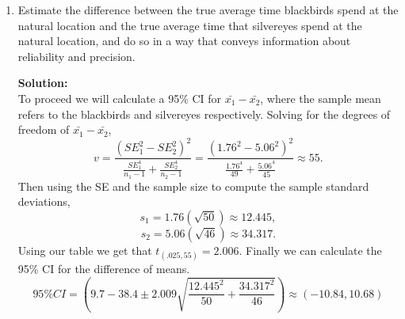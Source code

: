 \documentclass[12pt]{article}
\makeatletter
\theoremstyle{homework}
\newenvironment{exercise}[1]
{\def\@currentlabel{#1}\exercisecore}
{\endexercisecore}
\newcommand{\localhead}[1]{\par\smallskip\noindent\textbf{#1}\nobreak\\}%
\newcommand\solution{\localhead{Solution:}}
\makeatother
\begin{document}
\begin{exercise}{9.24}
\begin{enumerate}
    \item Estimate the difference between the true average time blackbirds spend at the natural location and the true average time that silvereyes spend at the natural 
    location, and do so in a way that conveys information about reliability and precision.\\
    \solution To proceed we will calculate a 95\% CI for $\bar{x_1} - \bar{x_2}$, where the sample mean refers to the blackbirds and silvereyes respectively. Solving for the degrees
    of freedom of $\bar{x_1} - \bar{x_2}$,
    \begin{equation*}
      v = \dfrac{(SE_1^2 - SE_2^2)^2}{\frac{SE_1^4}{n_1-1}  + \frac{SE_2^4}{n_2 - 1}} = \dfrac{(1.76^2 - 5.06^2)^2}{\frac{1.76^4}{49}  + \frac{5.06^4}{45}} \approx 55. 
    \end{equation*}
    Then using the SE and the sample size to compute the sample standard deviations, 
    \begin{equation*}
      s_1 = 1.76(\sqrt{50}) \approx 12.445,
    \end{equation*}
    \begin{equation*}
      s_2 = 5.06(\sqrt{46}) \approx 34.317.
    \end{equation*}
    Using our table we get that $t_{(.025, 55)} = 2.006$. Finally we can calculate the 95\% CI for the difference of means. 
    \begin{equation*}
      95\%CI = (9.7 - 38.4 \pm 2.009 \sqrt{\frac{12.445^2}{50} +\frac{34.317^2}{46}}) \approx (-10.84, 10.68)
    \end{equation*}
  \end{enumerate}
\end{exercise}
\vspace{.5in}
\end{document}

